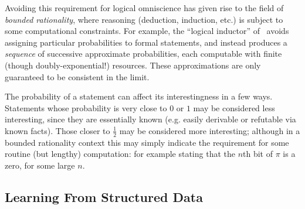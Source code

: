 Avoiding this requirement for logical omniscience has given rise to the field of
\emph{bounded rationality}, where reasoning (deduction, induction, etc.) is
subject to some computational constraints. For example, the ``logical inductor''
of~\cite{garrabrant2016logical} avoids assigning particular probabilities to
formal statements, and instead produces a \emph{sequence} of successive
approximate probabilities, each computable with finite (though
doubly-exponential!) resources. These approximations are only guaranteed to be
consistent in the limit.

The probability of a statement can affect its interestingness in a few ways.
Statements whose probability is very close to $0$ or $1$ may be considered
less interesting, since they are essentially known (e.g. easily derivable or
refutable via known facts). Those closer to $\frac{1}{2}$ may be considered more
interesting; although in a bounded rationality context this may simply indicate
the requirement for some routine (but lengthy) computation: for example stating
that the $n$th bit of $\pi$ is a zero, for some large $n$.

\iffalse
\subsection{Interestingness in Concept Formation}
\label{sec:conceptformation}

\cite{Montano-Rivas.McCasland.Dixon.ea:2012}
\cite{Piantadosi.Tenenbaum.Goodman:2012}
\cite{Wille:2005}
\cite{colton1999automatic}
\cite{colton2000agent}
\cite{colton2012automated}
\cite{lenat1977automated}
\cite{mullerunderstanding}
\cite{Bundy.Cavallo.Dixon.ea:2015}
\cite{johansson2009isacosy}
\cite{spector2008genetic}
\cite{colton2012automated}
\cite{geng2006interestingness}



\fi

\subsection{Learning From Structured Data}

